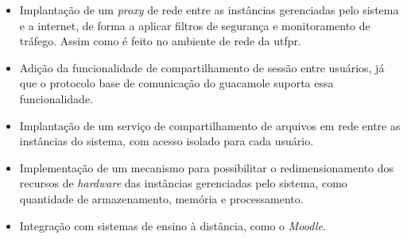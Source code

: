 \begin{itemize}
    \item Implantação de um \textit{proxy} de rede entre as instâncias gerenciadas pelo sistema e a internet, de forma a aplicar filtros de segurança e monitoramento de tráfego. Assim como é feito no ambiente de rede da \gls{utfpr}.

    \item Adição da funcionalidade de compartilhamento de sessão entre usuários, já que o protocolo base de comunicação do \gls{guacamole} suporta essa funcionalidade. 

    \item Implantação de um serviço de compartilhamento de arquivos em rede entre as instâncias do sistema, com acesso isolado para cada usuário.

    \item Implementação de um mecanismo para possibilitar o redimensionamento dos recursos de \textit{hardware} das instâncias gerenciadas pelo sistema, como quantidade de armazenamento, memória e processamento.

    \item Integração com sistemas de ensino à distância, como o \textit{Moodle}.
\end{itemize}